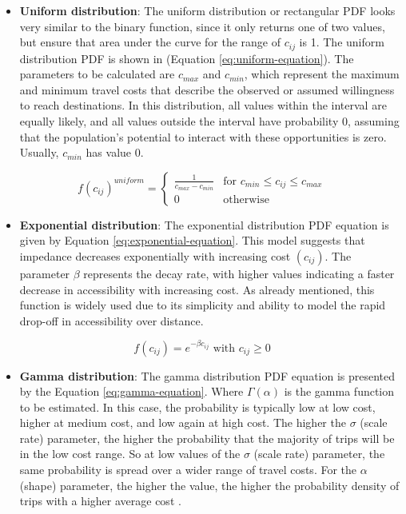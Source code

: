 \documentclass[preprint, 3p,
authoryear]{elsarticle} %
\providecommand{\tightlist}{%
  \setlength{\itemsep}{0pt}\setlength{\parskip}{0pt}}
\begin{document}
\begin{itemize}
\tightlist
\item
  \textbf{Uniform distribution}: The uniform distribution or rectangular
  PDF looks very similar to the binary function, since it only returns
  one of two values, but ensure that area under the curve for the range
  of \(c_{ij}\) is 1. The uniform distribution PDF is shown in (Equation
  \ref{eq:uniform-equation}). The parameters to be calculated are
  \(c_{max}\) and \(c_{min}\), which represent the maximum and minimum
  travel costs that describe the observed or assumed willingness to
  reach destinations. In this distribution, all values within the
  interval are equally likely, and all values outside the interval have
  probability 0, assuming that the population's potential to interact
  with these opportunities is zero. Usually, \(c_{min}\) has value 0.
\end{itemize}

\begin{equation}
f(c_{ij})^{uniform} =
\begin{cases}
  \frac{1}{c_{max} - c_{min}} & \text{for } c_{min} \le c_{ij} \le c_{max} \\
  0 & \text{otherwise}
\end{cases}
\label{eq:uniform-equation}
\end{equation}

\begin{itemize}
\tightlist
\item
  \textbf{Exponential distribution}: The exponential distribution PDF
  equation is given by Equation \ref{eq:exponential-equation}. This
  model suggests that impedance decreases exponentially with increasing
  cost \((c_{ij})\). The parameter \(\beta\) represents the decay rate,
  with higher values indicating a faster decrease in accessibility with
  increasing cost. As already mentioned, this function is widely used
  due to its simplicity and ability to model the rapid drop-off in
  accessibility over distance.
\end{itemize}

\begin{equation}
f(c_{ij}) = e^{-\beta c_{ij}} \text{ with } c_{ij} \ge 0
\label{eq:exponential-equation}
\end{equation}

\begin{itemize}
\tightlist
\item
  \textbf{Gamma distribution}: The gamma distribution PDF equation is
  presented by the Equation \ref{eq:gamma-equation}. Where
  \(\Gamma(\alpha)\) is the gamma function to be estimated. In this
  case, the probability is typically low at low cost, higher at medium
  cost, and low again at high cost. The higher the \(\sigma\) (scale
  rate) parameter, the higher the probability that the majority of trips
  will be in the low cost range. So at low values of the \(\sigma\)
  (scale rate) parameter, the same probability is spread over a wider
  range of travel costs. For the \(\alpha\) (shape) parameter, the
  higher the value, the higher the probability density of trips with a
  higher average cost \citep{soukhov2024}.
\end{itemize}
\end{document}

